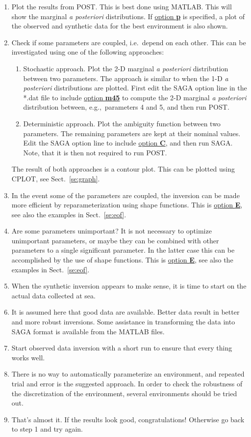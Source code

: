 \documentclass{saclantc}
\begin{document}
\begin{enumerate}
\item Plot the results from {\sf POST}. This is best done using MATLAB.
This will show the marginal {\it a posteriori } distributions.
If \underline{option {\bf p}} is specified, 
a plot of the observed  and synthetic data for the best
environment is also shown.
\item Check if some parameters are coupled, i.e.\ depend on each
other. 
This can be investigated
using one of the following approaches:
\begin{enumerate}
  \item Stochastic approach. Plot the 2-D marginal
  {\it a posteriori } distribution between two parameters. The approach
  is similar to when the 1-D {\it a posteriori } distributions are
  plotted. First edit the {\sf SAGA} option line in the *.dat file to include 
  \underline{option {\bf m45}} to compute the 2-D marginal
  {\it a posteriori } distribution between, e.g.,\ parameters 4 and 5, and then
  run {\sf POST}.
  \item Deterministic approach.
  Plot the ambiguity function between two
  parameters. The remaining parameters are kept at their nominal values.
  Edit the {\sf SAGA} option line to include 
  \underline{option {\bf C}}, and then
  run {\sf SAGA}. Note, that it is then not required to run {\sf POST}.
\end{enumerate}
The result of both  approaches is a contour plot. This can be plotted
using {\sf CPLOT}, see Sect.\ \ref{se:graph}.
\item In the event some of the parameters are coupled, the
inversion can be made more efficient by reparameterization
 using shape functions. This is \underline{option {\bf
E}},  see also
the examples in Sect.\ \ref{se:eof}.
\item Are some parameters unimportant?  It is not necessary
to optimize unimportant parameters, or maybe they can be combined with other
parameters to a single significant parameter. In the latter case this
can be accomplished by the use of shape functions. 
This is \underline{option {\bf E}},  see also
the examples in Sect.\ \ref{se:eof}.
\item When the synthetic inversion appears to make sense, it is time to
start on the actual data collected at sea.
\item It is assumed here that good data are available. Better data
result in better and more robust inversions. Some assistance in
transforming the data into {\sf SAGA} format is available from the MATLAB
files.
\item Start observed data inversion with a short run to ensure that
every thing  works well.
\item There is no way to automatically parameterize an environment, 
and repeated trial and error is the suggested approach. In order to check the
robustness of the discretization of the environment, several
environments should be tried out.
\item That's almost it.
If the results look good, congratulations! Otherwise go back to step 1
and try again.
\end{enumerate}
\end{document}
